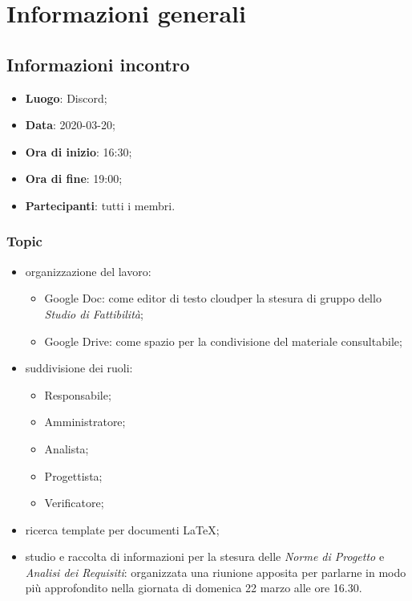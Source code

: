 \section{Informazioni generali}
\subsection{Informazioni incontro}
\begin{itemize}
\item \textbf{Luogo}: Discord\glo;
\item \textbf{Data}: 2020-03-20;
\item \textbf{Ora di inizio}: 16:30;
\item \textbf{Ora di fine}: 19:00;
\item \textbf{Partecipanti}: tutti i membri.
\end{itemize}

\subsubsection{Topic}
\begin{itemize}
\item organizzazione del lavoro:
\begin{itemize}
\item Google Doc: come editor di testo cloud\glo per la stesura di gruppo dello \textit{Studio di Fattibilità};
\item Google Drive: come spazio per la condivisione del materiale consultabile;
\end{itemize}
\item suddivisione dei ruoli: \begin{itemize}
\item Responsabile;
\item Amministratore;
\item Analista;
\item Progettista;
\item Verificatore;
\end{itemize}
\item ricerca template per documenti \LaTeX{};
\item studio e raccolta di informazioni per la stesura delle \textit{Norme di Progetto} e \textit{Analisi dei Requisiti}: organizzata una riunione apposita per parlarne in modo più approfondito nella giornata di domenica 22 marzo alle ore 16.30.
\end{itemize}